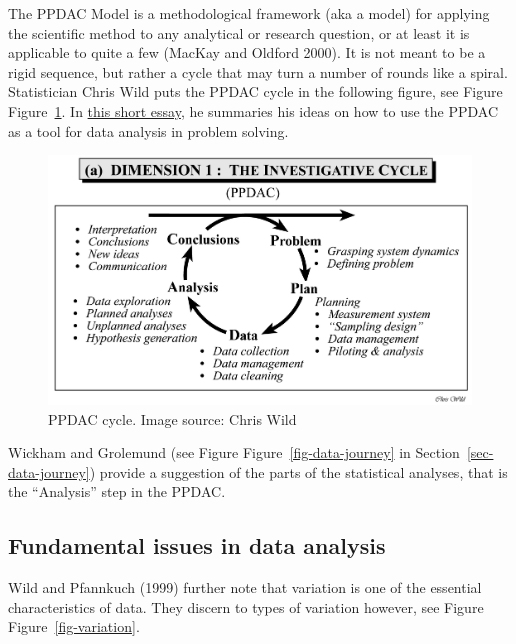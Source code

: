\documentclass[
  letterpaper,
  DIV=11,
  numbers=noendperiod]{scrreprt}
\theoremstyle{definition}
\theoremstyle{definition}
\theoremstyle{remark}
\begin{document}
The PPDAC Model is a methodological framework (aka a model) for applying
the scientific method to any analytical or research question, or at
least it is applicable to quite a few (MacKay and Oldford 2000). It is
not meant to be a rigid sequence, but rather a cycle that may turn a
number of rounds like a spiral. Statistician Chris Wild puts the PPDAC
cycle in the following figure, see Figure Figure~\ref{fig-ppdac}. In
\href{https://www.stat.auckland.ac.nz/~wild/d2i/articles/1.4\%20Place\%20of\%20data\%20analysis\%20in\%20problem\%20solving_ARTICLE.pdf}{this
short essay}, he summaries his ideas on how to use the PPDAC as a tool
for data analysis in problem solving.

\begin{figure}

{\centering \includegraphics{./img/ppdac.png}

}

\caption{\label{fig-ppdac}PPDAC cycle. Image source: Chris Wild}

\end{figure}

Wickham and Grolemund (see Figure Figure~\ref{fig-data-journey} in
Section~\ref{sec-data-journey}) provide a suggestion of the parts of the
statistical analyses, that is the ``Analysis'' step in the PPDAC.

\hypertarget{fundamental-issues-in-data-analysis}{%
\subsection{Fundamental issues in data
analysis}\label{fundamental-issues-in-data-analysis}}

Wild and Pfannkuch (1999) further note that variation is one of the
essential characteristics of data. They discern to types of variation
however, see Figure Figure~\ref{fig-variation}.
\end{document}
